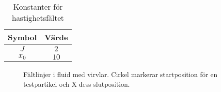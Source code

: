 \documentclass[12pt,a4paper]{article}
\begin{document}
\begin{table}[h!]
\centering
\begin{tabular}{c|c}
 Symbol & Värde \\
 \hline
 $J$ & $2$ \\
 $x_0$ & $10$
\end{tabular}
\caption{Konstanter för hastighetsfältet}
\label{tab:fluid_konstanter}
\end{table}


\begin{figure}[!ht]
    \centering
    \caption{\label{fig:fluid} Fältlinjer i fluid med virvlar. Cirkel markerar startposition för en testpartikel och X dess slutposition.}
\end{figure}
\end{document}
